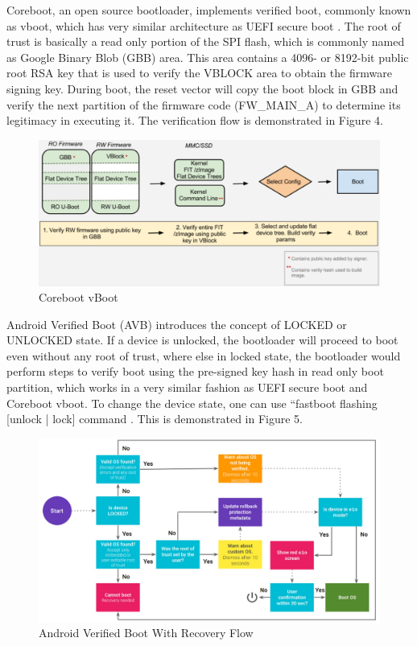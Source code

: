 \documentclass[review]{elsarticle}
\begin{document}
Coreboot, an open source bootloader, implements verified boot, commonly known as vboot, which has very similar architecture as UEFI secure boot \cite{R5:16}. The root of trust is basically a read only portion of the SPI flash, which is commonly named as Google Binary Blob (GBB) area. This area contains a 4096- or 8192-bit public root RSA key that is used to verify the VBLOCK area to obtain the firmware signing key. During boot, the reset vector will copy the boot block in GBB and verify the next partition of the firmware code (FW\_MAIN\_A) to determine its legitimacy in executing it. The verification flow is demonstrated in Figure 4.
 

\begin{figure}[H]
	\centering
	\includegraphics[width=1\textwidth]{figs/CorebootVboot.JPG}
	\caption{Coreboot vBoot \cite{R5:16}}
\end{figure}

Android Verified Boot (AVB) introduces the concept of LOCKED or UNLOCKED state. If a device is unlocked, the bootloader will proceed to boot even without any root of trust, where else in locked state, the bootloader would perform steps to verify boot using the pre-signed key hash in read only boot partition, which works in a very similar fashion as UEFI secure boot and Coreboot vboot. To change the device state, one can use “fastboot flashing [unlock | lock] command \cite{R5:17}. This is demonstrated in Figure 5.


\begin{figure}[H]
	\centering
	\includegraphics[width=1\textwidth]{figs/AndroidVerifiedBootWithRecoveryFlow.JPG}
	\caption{Android Verified Boot With Recovery Flow \cite{R5:17}}
\end{figure}
\end{document}
